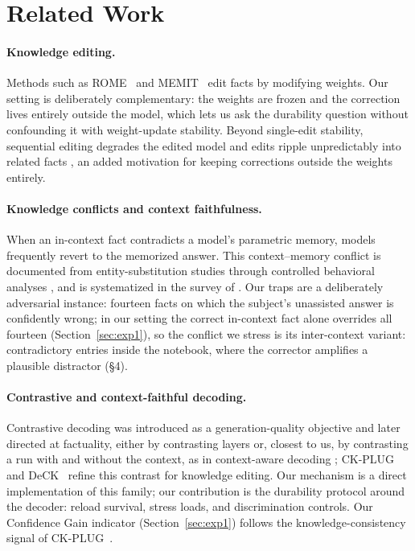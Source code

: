 \documentclass[11pt]{article}
\begin{document}
\section{Related Work}

\paragraph{Knowledge editing.} Methods such as ROME~\cite{rome} and
MEMIT~\cite{memit} edit facts by modifying weights.
Our setting is deliberately complementary: the weights are frozen and the
correction lives entirely outside the model, which lets us ask the durability
question without confounding it with weight-update stability.
Beyond single-edit stability, sequential editing degrades the edited model
\citep{gupta2024editing} and edits ripple unpredictably into related facts
\citep{cohen2024ripple}, an added motivation for keeping corrections outside
the weights entirely.

\paragraph{Knowledge conflicts and context faithfulness.}
When an in-context fact contradicts a model's parametric memory, models
frequently revert to the memorized answer. This context--memory conflict is
documented from entity-substitution studies \citep{longpre2021entity} through
controlled behavioral analyses \citep{xie2024adaptive}, and is systematized in
the survey of \citet{xu2024knowledge}. Our traps are a deliberately adversarial
instance: fourteen facts on which the subject's unassisted answer is
confidently wrong; in our setting the correct in-context fact alone overrides
all fourteen (Section~\ref{sec:exp1}), so the conflict we stress is its inter-context variant:
contradictory entries inside the notebook, where the corrector amplifies a
plausible distractor (\S4).

\paragraph{Contrastive and context-faithful decoding.}
Contrastive decoding was introduced as a generation-quality objective
\citep{li2023contrastive} and later directed at factuality, either by
contrasting layers \citep{chuang2024dola} or, closest to us, by
contrasting a run with and without the context, as in context-aware decoding
\citep{shi2024trusting}; CK-PLUG~\cite{ckplug} and DeCK~\cite{deck} refine this
contrast for knowledge editing. Our mechanism is a direct implementation of this
family; our contribution is the durability protocol around the decoder:
reload survival, stress loads, and discrimination controls. Our
Confidence Gain indicator (Section~\ref{sec:exp1}) follows the
knowledge-consistency signal of CK-PLUG~\cite{ckplug}.
\end{document}
